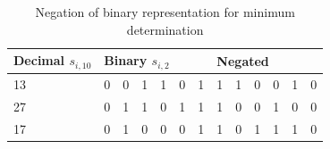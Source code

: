 		\begin{table}[!htb]
			\centering
			\caption{Negation of binary representation for minimum determination}
			\label{table:secure minimum negation}
			\begin{tabular}{|l|l|l|l|l|l|l|l|l|l|l|l|l|}
				\hline
				Decimal $s_{i,10}$ & \multicolumn{6}{l|}{Binary $s_{i,2}$}  & \multicolumn{6}{l|}{Negated} \\ \hline
				13                 & 0    & 0    & 1    & 1    & 0   & 1 & 1    & 1    & 0    & 0    & 1   & 0   \\ \hline
				27                 & 0    & 1    & 1    & 0    & 1   & 1 & 1    & 0    & 0    & 1    & 0   & 0   \\ \hline
				17                 & 0    & 1    & 0    & 0    & 0   & 1 & 1    & 0    & 1    & 1    & 1   & 0   \\ \hline
			\end{tabular}
		\end{table}

		\FloatBarrier
